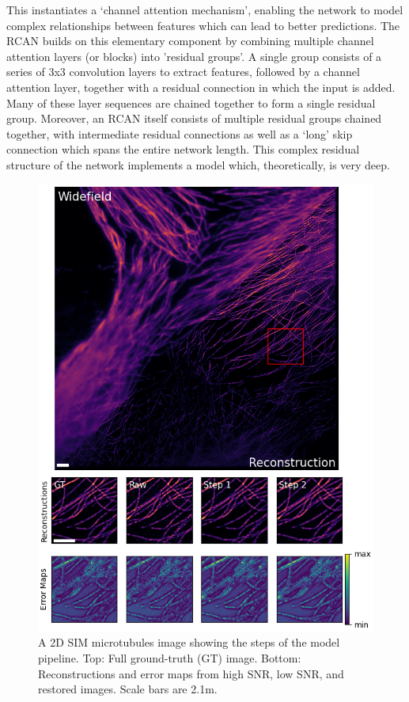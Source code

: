 \documentclass[12pt]{article}
\begin{document}
This instantiates a `channel attention mechanism', enabling the network to model complex relationships between features which can lead to better predictions.
The RCAN builds on this elementary component by combining multiple channel attention layers (or blocks) into 'residual groups'.
A single group consists of a series of 3x3 convolution layers to extract features,
followed by a channel attention layer, together with a residual connection in which the input is added.
Many of these layer sequences are chained together to form a single residual group.
Moreover, an RCAN itself consists of multiple residual groups chained together,
with intermediate residual connections as well as a `long' skip connection which spans the entire network length.
This complex residual structure of the network implements a model which, theoretically, is very deep.

\begin{figure}[hbtp]
    \includegraphics[scale=1.05, center]{figures/mt_1_008_error.png}
    \caption{A 2D SIM microtubules image showing the steps of the model pipeline.
    Top: Full ground-truth (GT) image. Bottom: Reconstructions and error maps from high SNR, low SNR, and restored images.
    Scale bars are 2.1\textmu m.}
    \label{fig:microtub_samples}
\end{figure}
\end{document}
